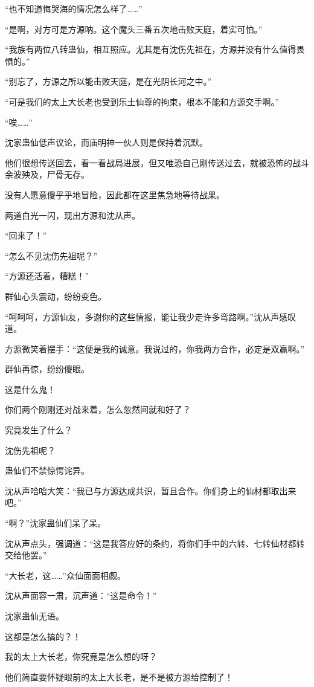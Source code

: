 \begin{this_body}
“也不知道悔哭海的情况怎么样了……”

“是啊，对方可是方源呐。这个魔头三番五次地击败天庭，着实可怕。”

“我族有两位八转蛊仙，相互照应。尤其是有沈伤先祖在，方源并没有什么值得畏惧的。”

“别忘了，方源之所以能击败天庭，是在光阴长河之中。”

“可是我们的太上大长老也受到乐土仙尊的拘束，根本不能和方源交手啊。”

“唉……”

沈家蛊仙低声议论，而庙明神一伙人则是保持着沉默。

他们很想传送回去，看一看战局进展，但又唯恐自己刚传送过去，就被恐怖的战斗余波殃及，尸骨无存。

没有人愿意傻乎乎地冒险，因此都在这里焦急地等待战果。

两道白光一闪，现出方源和沈从声。

“回来了！”

“怎么不见沈伤先祖呢？”

“方源还活着，糟糕！”

群仙心头震动，纷纷变色。

“呵呵呵，方源仙友，多谢你的这些情报，能让我少走许多弯路啊。”沈从声感叹道。

方源微笑着摆手：“这便是我的诚意。我说过的，你我两方合作，必定是双赢啊。”

群仙再惊，纷纷傻眼。

这是什么鬼！

你们两个刚刚还对战来着，怎么忽然间就和好了？

究竟发生了什么？

沈伤先祖呢？

蛊仙们不禁惊愕诧异。

沈从声哈哈大笑：“我已与方源达成共识，暂且合作。你们身上的仙材都取出来吧。”

“啊？”沈家蛊仙们呆了呆。

沈从声点头，强调道：“这是我答应好的条约，将你们手中的六转、七转仙材都转交给他罢。”

“大长老，这……”众仙面面相觑。

沈从声面容一肃，沉声道：“这是命令！”

沈家蛊仙无语。

这都是怎么搞的？！

我的太上大长老，你究竟是怎么想的呀？

他们简直要怀疑眼前的太上大长老，是不是被方源给控制了！


\end{this_body}
